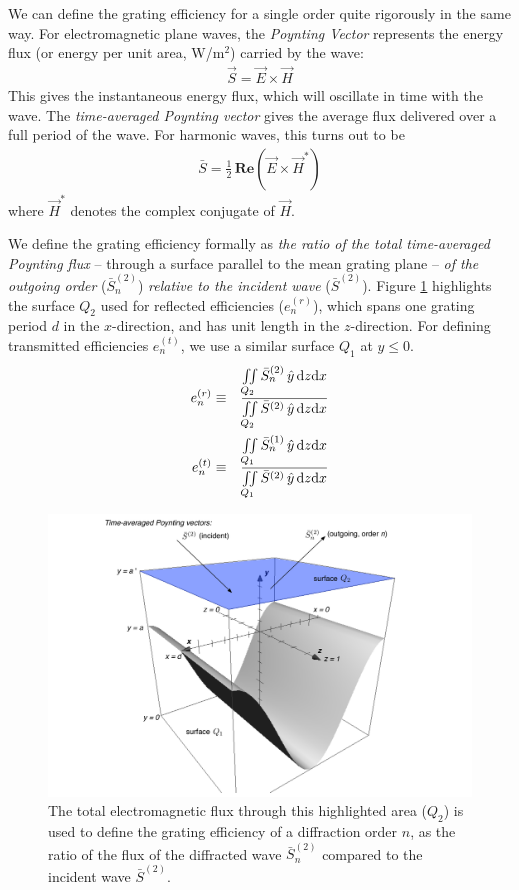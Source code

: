 We can define the grating efficiency for a single order quite rigorously in the same way.  For electromagnetic plane waves, the \emph{Poynting Vector} represents the energy flux (or energy per unit area, W/m$^2$) carried by the wave:
\begin{eqnarray}
\vec S = \vec E \times \vec H
\end{eqnarray}
This gives the instantaneous energy flux, which will oscillate in time with the wave.  The \emph{time-averaged Poynting vector} gives the average flux delivered over a full period of the wave.  For harmonic waves, this turns out to be
\begin{eqnarray}
 \bar S  = \frac{1}{2}\, \mathbf{Re} \left( \vec E \times \vec H^\ast \right)
\end{eqnarray}
where $\vec H^\ast$ denotes the complex conjugate of $\vec H$.

We define the grating efficiency formally as \emph{the ratio of the total time-averaged Poynting flux} -- through a surface parallel to the mean grating plane -- \emph{of the outgoing order }($\bar S_n^{(2)}$) \emph{relative to the incident wave} ($\bar S^{(2)}$).  Figure \ref{2c} highlights the surface $Q_2$ used for reflected efficiencies ($e_n^{(r)}$), which spans one grating period $d$ in the $x$-direction, and has unit length in the $z$-direction.  For defining transmitted efficiencies $e_n^{(t)}$, we use a similar surface $Q_1$ at $y\leq0$.
\begin{eqnarray}
e_n^{(r)} &\equiv& \frac{\iint \limits_{Q_2} \bar S_n^{(2)} \, \hat y \, \mathrm{d} z \mathrm{d} x}{ \iint \limits_{Q_2} \bar S^{(2)} \, \hat y \, \mathrm{d} z \mathrm{d} x} \\
e_n^{(t)} &\equiv&\frac{\iint \limits_{Q_1} \bar S_n^{(1)}\, \hat y \, \mathrm{d} z \mathrm{d} x}{ \iint \limits_{Q_1} \bar S^{(2)}\, \hat y \, \mathrm{d} z \mathrm{d} x}
\end{eqnarray}
          
\begin{figure}[htbp] %
   \centering
   \includegraphics[scale=0.6]{../data/Chapter2/2c_poynting/2c.pdf} 
   \caption{The total electromagnetic flux through this highlighted area ($Q_2$) is used to define the grating efficiency of a diffraction order $n$, as the ratio of the flux of the diffracted wave $\bar S_n^{(2)}$ compared to the incident wave $\bar S^{(2)}$.}
   \label{2c}
\end{figure}


